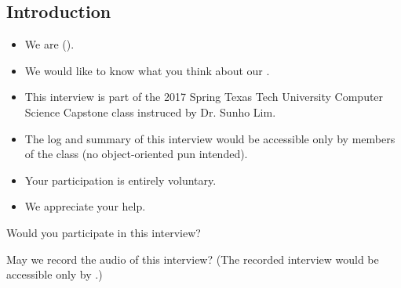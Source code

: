 \subsection{Introduction}

\begin{itemize}
\item We are \tc{} (\names).
\item We would like to know what you think about
  our \cry{} \cf.
\item This interview is part of the 2017 Spring
  Texas Tech University Computer Science Capstone class
  instruced by Dr. Sunho Lim.
\item The log and summary of this interview
  would be accessible only by members of the class
  (no object-oriented pun intended).
\item Your participation is entirely voluntary.
\item We appreciate your help.
\end{itemize}

\begin{question}
Would you participate in this interview?
\end{question}

\begin{question}
May we record the audio of this interview?
(The recorded interview would be accessible only by \tc.)
\end{question}
